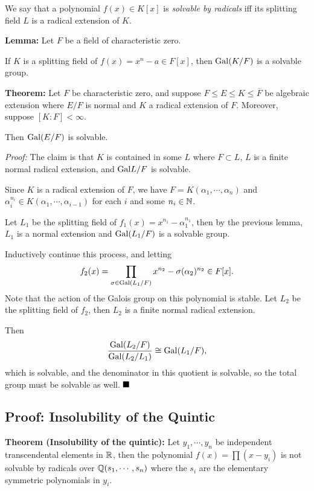 We say that a polynomial \(f(x) \in K[x]\) is \emph{solvable by
radicals} iff its splitting field \(L\) is a radical extension of \(K\).

\textbf{Lemma:} Let \(F\) be a field of characteristic zero.

If \(K\) is a splitting field of \(f(x) = x^n - a \in F[x]\), then
\(\mathrm{Gal}(K/F)\) is a solvable group.

\textbf{Theorem:} Let \(F\) be characteristic zero, and suppose
\(F \leq E \leq K \leq \overline F\) be algebraic extension where
\(E/F\) is normal and \(K\) a radical extension of \(F\). Moreover,
suppose \([K:F] < \infty\).

Then \(\mathrm{Gal}(E/F)\) is solvable.

\emph{Proof:} The claim is that \(K\) is contained in some \(L\) where
\(F \subset L\), \(L\) is a finite normal radical extension, and
\(\mathrm{Gal}{L/F}\) is solvable.

Since \(K\) is a radical extension of \(F\), we have
\(F = K(\alpha_1, \cdots, \alpha_n)\) and
\(\alpha_i^{n_i} \in K(\alpha_1, \cdots, \alpha_{i-1})\) for each \(i\)
and some \(n_i \in {\mathbb{N}}\).

Let \(L_1\) be the splitting field of
\(f_1(x) = x^{n_1} - \alpha_1^{n_1}\), then by the previous lemma,
\(L_1\) is a normal extension and \(\mathrm{Gal}(L_1/F)\) is a solvable group.

Inductively continue this process, and letting
\begin{align*}
f_2(x) = \prod_{\sigma \in \mathrm{Gal}(L_1/F)} x^{n_2} - \sigma(\alpha_2)^{n_2} \in F[x]
.\end{align*} Note that the action of the Galois group on this
polynomial is stable. Let \(L_2\) be the splitting field of \(f_2\),
then \(L_2\) is a finite normal radical extension.

Then
\begin{align*}
\frac{ \mathrm{Gal}(L_2/F) }{ \mathrm{Gal}(L_2/L_1) } \cong \mathrm{Gal}(L_1/F)
,\end{align*} which is solvable, and the denominator in this quotient is
solvable, so the total group must be solvable as well. \(\qed\)

\hypertarget{proof-insolubility-of-the-quintic}{%
\subsection{Proof: Insolubility of the
Quintic}\label{proof-insolubility-of-the-quintic}}

\textbf{Theorem (Insolubility of the quintic):} Let \(y_1, \cdots, y_n\)
be independent transcendental elements in \({\mathbb{R}}\), then the polynomial
\(f(x) = \prod (x-y_i)\) is not solvable by radicals over
\({\mathbb{Q}}(s_1, \cdots, s_n)\) where the \(s_i\) are the elementary symmetric
polynomials in \(y_i\).

